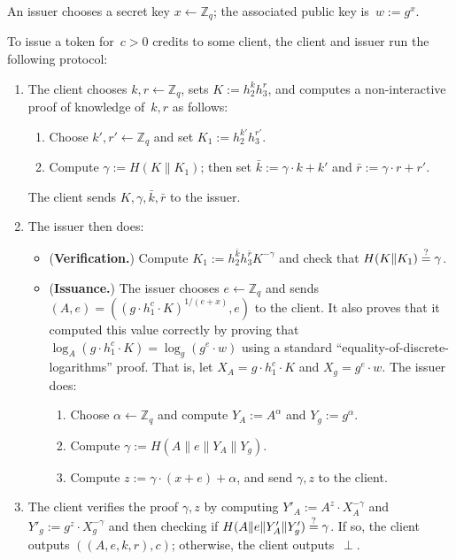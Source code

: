 \documentclass[11pt]{article}
\def\Z{{\mathbb Z}}
\def\Z{{\mathbb Z}}
\def\isequal{\stackrel{\rm ?}{=}}
\begin{document}
\medskip{}
An issuer chooses a secret key $x \leftarrow \Z_q$; the associated public key is~$w:=g^x$. 

\medskip{} 
To issue a token for~$c>0$ credits to some client, the client and issuer run the following protocol:
\begin{enumerate}
    \item The client chooses $k, r \leftarrow \Z_q$,  sets $K:=h_2^k h_3^r$, and computes a non-interactive proof of knowledge of~$k, r$ as follows: 
    \begin{enumerate}
        \item Choose $k', r' \leftarrow \Z_q$ and set $K_1:=h_2^{k'} h_3^{r'}$.
        \item Compute $\gamma:=H(K \| K_1)$; then set $\bar k:=\gamma \cdot k + k'$ and $\bar r := \gamma \cdot r + r'$. 
    \end{enumerate}
    The client sends $K, \gamma, \bar k, \bar r$ to the issuer.
    
    \item The issuer then does:
    \begin{itemize} 
    \item ({\bf Verification.}) Compute $K_1:= h_2^{\bar k} h_3^{\bar r} K^{-\gamma}$ and check that $H(K\|K_1) \isequal \gamma$.

\item ({\bf Issuance.}) The issuer chooses
$e \leftarrow \Z_q$ and sends
$(A, e) = \left(\left(g \cdot h_1^c \cdot K\right)^{1/(e+x)}, e\right)$
to the client. 
It also proves that it computed this value correctly by proving that $\log_A \left(g \cdot h_1^c \cdot K\right) = \log_g \left(g^e \cdot w\right)$ using a standard ``equality-of-discrete-logarithms'' proof. 
That is, let $X_A = g \cdot h_1^c \cdot K$ and $X_g = g^e \cdot w$. The issuer does:
\begin{enumerate}
    \item Choose $\alpha \leftarrow \Z_q$ and compute $Y_A:= A^{\alpha}$ and $Y_g:=g^\alpha$.
    \item Compute $\gamma:=H(A\|e\|Y_A\|Y_g)$.
    \item Compute $z:=\gamma\cdot (x+e)+\alpha$, and send $\gamma, z$ to the client.
\end{enumerate}
\end{itemize}
\item The client verifies the proof $\gamma, z$ by computing $Y'_A:= A^z \cdot X_A^{-\gamma}$ and $Y'_g:=g^z \cdot X_g^{-\gamma}$ and then
checking if 
$H( A\|e\|Y'_A \| Y'_g ) \isequal \gamma$. If so, the client outputs $((A, e, k, r), c)$; otherwise, the client outputs~$\perp$.
\end{enumerate}
\end{document}
